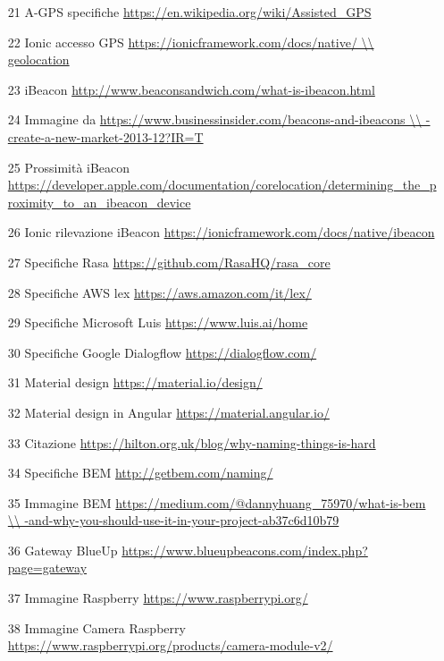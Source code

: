 \begin{itemize}
\item [21] A-GPS specifiche \url{https://en.wikipedia.org/wiki/Assisted_GPS}
\item [22] Ionic accesso GPS \url{https://ionicframework.com/docs/native/ \\
geolocation}
\item [23] iBeacon \url{http://www.beaconsandwich.com/what-is-ibeacon.html}
\item [24] Immagine da \url{https://www.businessinsider.com/beacons-and-ibeacons \\
-create-a-new-market-2013-12?IR=T}
\item [25] Prossimità iBeacon \url{https://developer.apple.com/documentation/corelocation/determining_the_proximity_to_an_ibeacon_device}
\item [26] Ionic rilevazione iBeacon \url{https://ionicframework.com/docs/native/ibeacon}
\item [27] Specifiche Rasa \url{https://github.com/RasaHQ/rasa_core}
\item [28] Specifiche AWS lex \url{https://aws.amazon.com/it/lex/}
\item [29] Specifiche Microsoft Luis \url{https://www.luis.ai/home}
\item [30] Specifiche Google Dialogflow \url{https://dialogflow.com/}
\item [31] Material design \url{https://material.io/design/}
\item [32] Material design in Angular \url{https://material.angular.io/}
\item [33] Citazione \url{https://hilton.org.uk/blog/why-naming-things-is-hard}
\item [34] Specifiche BEM \url{http://getbem.com/naming/}
\item [35] Immagine BEM \url{https://medium.com/@dannyhuang_75970/what-is-bem \\
-and-why-you-should-use-it-in-your-project-ab37c6d10b79}
\item [36] Gateway BlueUp  \url{https://www.blueupbeacons.com/index.php?page=gateway}
\item [37] Immagine Raspberry \url{https://www.raspberrypi.org/}
\item [38] Immagine Camera Raspberry \url{https://www.raspberrypi.org/products/camera-module-v2/}
\end{itemize}
